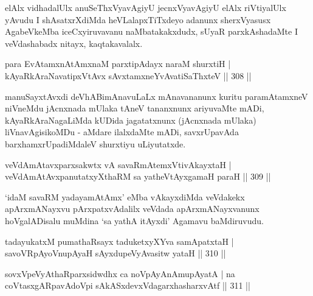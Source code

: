 \begin{artha}
elAlx vidhadalUlx anuSeThxVyavAgiyU jecnxVyavAgiyU elAlx riVtiyalUlx yAvudu I shAsatxrXdiMda heVLalapxTiTxdeyo adanunx sherxVyasusx AgabeVkeMba iceCxyiruvavanu naMbatakakxdudx, sUyaR parxkAshadaMte I veVdashabadx nitayx, kaqtakavalalx.
\end{artha}

\begin{shl}
para EvA\s \s tamxnA\s \s tAmxnaM parxtipAdayx naraM shurxtiH |
kAyaRkAraNavatipxVtAvx sAvxtamxneYvAvatiSaThxteV \hfill || 308 ||
\end{shl}

\begin{artha}
manuSayxtAvxdi deVhABimAnavuLaLx mAnavananunx kuritu paramAtamxneV niVneMdu jAcnxnada mUlaka tAneV tananxnunx ariyuvaMte mADi, kAyaRkAraNagaLiMda kUDida jagatatxnunx (jAcnxnada mUlaka) liVnavAgisikoMDu - aMdare ilalxdaMte mADi, savxrUpavAda barxhamxrUpadiMdaleV shurxtiyu uLiyutatxde.
\end{artha}


\begin{shl}
veVdAmAtavxparxsakwtx vA savaRmAtemxVtivAkayxtaH |
veVdAmAtAvxpanutatxyXthaRM sa yatheVtAyxgamaH paraH \hfill || 309 ||
\end{shl}

\begin{artha}
`idaM savaRM yadayamAtAmx' eMba vAkayxdiMda veVdakekx apArxmANayxvu pArxpatxvAdalilx veVdada apArxmANayxvanunx hoVgalADisalu muMdina `sa yathA itAyxdi' Agamavu baMdiruvudu.
\end{artha}

\begin{shl}
tadayukatxM pumathaRsayx taduketxyXYva samApatxtaH |
savoVRpAyoV\s nupAyaH sAyxdupeVyAvasitw yataH \hfill || 310 ||
\end{shl}
\begin{shl}
sovxVpeVyAthaRparxsidwdhx ca noVpAyAnAmupAyatA |
na coVtasxgARpavAdoV\s pi sAkASxdevxVdagarxhasharxvAtf \hfill || 311 ||
\end{shl}

